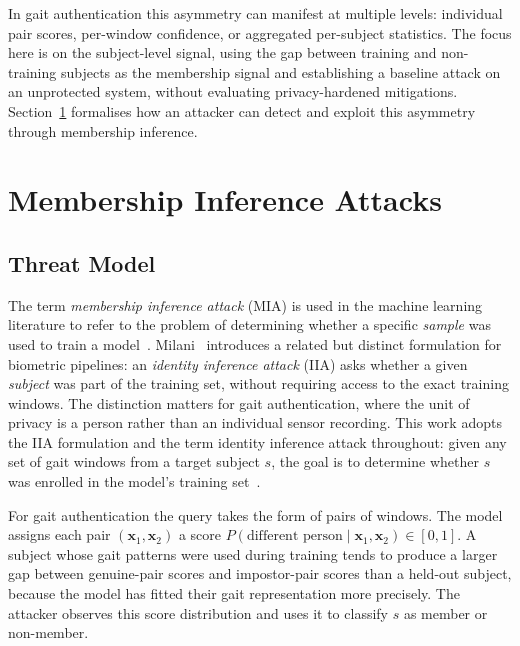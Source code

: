 In gait authentication this asymmetry can manifest at multiple levels: individual pair scores, per-window confidence, or aggregated per-subject statistics. The focus here is on the subject-level signal, using the gap between training and non-training subjects as the membership signal and establishing a baseline attack on an unprotected system, without evaluating privacy-hardened mitigations. Section~\ref{sec:bg_mia} formalises how an attacker can detect and exploit this asymmetry through membership inference.

\section{Membership Inference Attacks}
\label{sec:bg_mia}

\subsection{Threat Model}
\label{ssec:bg_threat}

The term \emph{membership inference attack} (MIA) is used in the machine learning literature to refer to the problem of determining whether a specific \emph{sample} was used to train a model~\cite{shokri2017membership}. Milani~\cite{milani2024gait} introduces a related but distinct formulation for biometric pipelines: an \emph{identity inference attack} (IIA) asks whether a given \emph{subject} was part of the training set, without requiring access to the exact training windows. The distinction matters for gait authentication, where the unit of privacy is a person rather than an individual sensor recording. This work adopts the IIA formulation and the term identity inference attack throughout: given any set of gait windows from a target subject $s$, the goal is to determine whether $s$ was enrolled in the model's training set~\cite{li2022userlevel}.

For gait authentication the query takes the form of pairs of windows. The model assigns each pair $(\mathbf{x}_1, \mathbf{x}_2)$ a score $P(\text{different person} \mid \mathbf{x}_1, \mathbf{x}_2) \in [0, 1]$. A subject whose gait patterns were used during training tends to produce a larger gap between genuine-pair scores and impostor-pair scores than a held-out subject, because the model has fitted their gait representation more precisely. The attacker observes this score distribution and uses it to classify $s$ as member or non-member.

